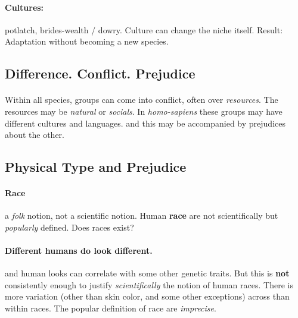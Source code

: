 \documentclass{article}
\begin{document}
	\paragraph{Cultures:} potlatch, brides-wealth / dowry.
	\newline Culture can change the niche itself.
	\newline Result: Adaptation without becoming a new species.

	\subsection{Difference. Conflict. Prejudice}
	\paragraph{} Within all species, groups can come into conflict, often over \emph{resources}.
	\newline The resources may be \emph{natural} or \emph{socials}.
	\newline In \emph{homo-sapiens} these groups may have different cultures and languages.
	\newline and this may be accompanied by prejudices about the other.
	\newline {}

	\subsection{Physical Type and Prejudice}
	\paragraph{Race} a \emph{folk} notion, not a scientific notion. Human \textbf{race} are not scientifically but \emph{popularly} defined.
	\newline Does races exist?
	\newline {}

	\paragraph{Different humans do look different.} and human looks can correlate with some other genetic traits. But this is \textbf{not} consistently enough to justify \emph{scientifically} the notion of human races.
	\newline There is more variation (other than skin color, and some other exceptions) across than within races.
	\newline The popular definition of race are \emph{imprecise}.
\end{document}
